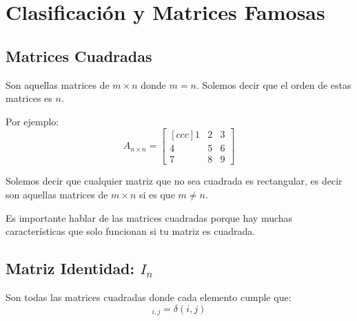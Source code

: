 \documentclass[12pt, fleqn]{report}                             %
\theoremstyle{break}                                            %
\begin{document}
        \section{Clasificación y Matrices Famosas}

            \subsection{Matrices Cuadradas}

                Son aquellas matrices de $m \times n$ donde $m = n$.
                Solemos decir que el orden de estas matrices es $n$.

                Por ejemplo: 
                \begin{equation*}
                    A_{n \times n} =
                    \begin{bmatrix}[ccc]
                        1 & 2 & 3 \\
                        4 & 5 & 6 \\
                        7 & 8 & 9
                    \end{bmatrix}
                \end{equation*}

                Solemos decir que cualquier matriz que no sea cuadrada es
                rectangular, es decir son aquellas matrices de $m \times n$
                si es que $m \neq n$.

                Es importante hablar de las matrices cuadradas porque hay muchas
                características que solo funcionan si tu matriz es cuadrada.



            \clearpage
            \subsection{Matriz Identidad: $I_n$}

                Son todas las matrices cuadradas donde cada elemento cumple que:
                \begin{equation*}
                    [I]_{i, j} = \delta(i, j)
                \end{equation*}
\end{document}
